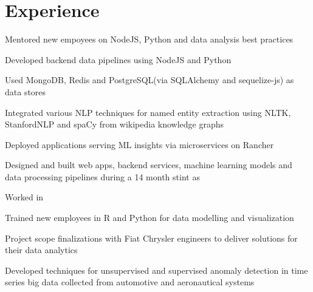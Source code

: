 \documentclass[]{deedy-resume-openfont}
\begin{document}
\begin{minipage}[t]{0.64\textwidth}


\section{Experience}

\vspace{\topsep} %
\begin{tightemize}
\item Mentored new empoyees on NodeJS, Python and data analysis best practices
\item Developed backend data pipelines using NodeJS and Python
\item Used MongoDB, Redis and PostgreSQL(via SQLAlchemy and sequelize-js) as data stores
\item Integrated various NLP techniques for named entity extraction using NLTK,
  StanfordNLP and spaCy from wikipedia knowledge graphs
\item Deployed applications serving ML insights via microservices on Rancher
\end{tightemize}
\sectionsep

\begin{tightemize}
\item Designed and built web apps, backend services, machine learning models and data
  processing pipelines during a 14 month stint as 
\item Worked in 
\item Trained new employees in R and Python for data modelling and visualization
\item Project scope finalizations with Fiat Chrysler engineers to deliver solutions for their data analytics
\end{tightemize}
\sectionsep

\begin{tightemize}
\item Developed techniques for unsupervised and supervised anomaly detection in
  time series big data collected from automotive and aeronautical systems
\end{tightemize}
\sectionsep


\end{minipage}
\end{document}
